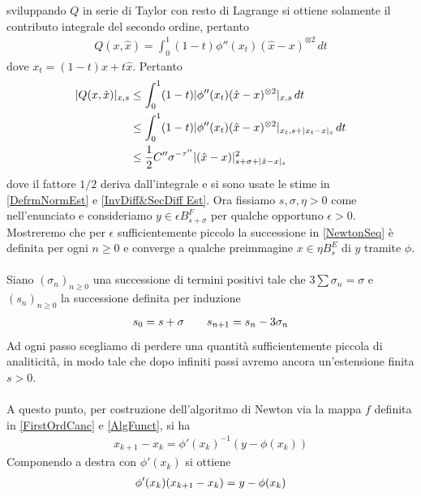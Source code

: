 \documentclass[twoside, 11pt]{amsbook}
\makeatletter
\newcommand{\0}{{(0)}}
\newcommand{\3}{{(3)}}
\theoremstyle{colonplain}
\theoremstyle{colondefinition}
\theoremstyle{colonremark}
\numberwithin{equation}{chapter}
\renewcommand{\proofname}{Dimostrazione}
\renewenvironment{proof}[1][\proofname]{\par
  \pushQED{\qed}%
  \normalfont \topsep6\p@\@plus6\p@\relax
  \trivlist
  \item[\hskip\labelsep\bfseries #1:]\ignorespaces
}{%
  \popQED\endtrivlist\@endpefalse
}
\makeatother
\begin{document}
\begin{proof}
\begin{proof} sviluppando $Q$ in serie di Taylor con resto di Lagrange si ottiene solamente il contributo integrale del secondo ordine, pertanto
\begin{align}
    Q(x, \hat{x}) = \int_0^1 (1 - t)\phi''(x_t)(\hat{x} - x)^{\otimes 2} \, dt
\end{align}
dove $x_t = (1 - t)x + t\hat{x}$. Pertanto
\begin{align}
    |Q(x, \hat{x})|_{x, s} &\leq \int_0^1 (1 - t)|\phi''(x_t)(\hat{x} - x)^{\otimes 2}|_{x, s} \, dt \notag \\
    &\leq \int_0^1 (1 - t)|\phi''(x_t)(\hat{x} - x)^{\otimes 2}|_{x_t, s + |x_t - x|_s} \, dt \notag \\
    &\leq \frac{1}{2}C''\sigma^{-\tau''}|(\hat{x} - x)|^2_{s + \sigma + |\hat{x} - x|_s}
\end{align}
dove il fattore $1/2$ deriva dall'integrale e si sono usate le stime in \eqref{DefrmNormEst} e \eqref{InvDiff&SecDiff Est}.
\end{proof}
Ora fissiamo $s, \sigma, \eta > 0$ come nell'enunciato e consideriamo $y \in \epsilon B^F_{s + \sigma}$ per qualche opportuno $\epsilon > 0$. Mostreremo che per $\epsilon$ sufficientemente piccolo la successione in \eqref{NewtonSeq} è definita per ogni $n \geq 0$ e converge a qualche preimmagine $x \in \eta B^E_{s}$ di $y$ tramite $\phi$. \\ \\
Siano $(\sigma_n)_{n \geq 0}$ una successione  di termini positivi tale che $3\sum \sigma_n = \sigma$ e $(s_n)_{n \geq 0}$ la successione definita per induzione
\begin{align}
    s_0 = s + \sigma \qquad s_{n + 1} = s_n - 3\sigma_n \notag
\end{align} 
Ad ogni passo scegliamo di perdere una quantità sufficientemente piccola di analiticità, in modo tale che dopo infiniti passi avremo ancora un'estensione finita $s > 0$. \\ \\
A questo punto, per costruzione dell'algoritmo di Newton via la mappa $f$ definita in \eqref{FirstOrdCanc} e \eqref{AlgFunct}, si ha
\begin{align}\label{x_k+1 - x_k}
    x_{k + 1} - x_k = \phi'(x_k)^{-1}(y - \phi(x_k))
\end{align}
Componendo a destra con $\phi'(x_k)$ si ottiene
\begin{align}
    \phi'(x_k)(x_{k + 1} - x_k) = y - \phi(x_k) \notag
\end{align}

\end{proof}
\end{document}
